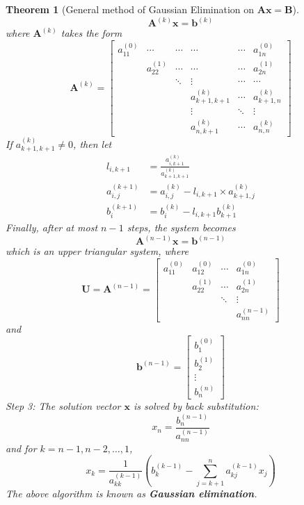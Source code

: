 \documentclass[12pt]{article}
\newtheorem{theorem}{Theorem}[section]
\theoremstyle{definition}
\begin{document}
\begin{theorem}[General method of Gaussian Elimination on $\mathbf{A}\mathbf{x}=\mathbf{B}$]
\[
\mathbf{A}^{(k)}\mathbf{x}=\mathbf{b}^{(k)}
\]
where $\mathbf{A}^{(k)}$ takes the form
\[
\mathbf{A}^{(k)}=\begin{bmatrix}
a_{11}^{(0)}&\cdots       &\cdots&\cdots            &\cdots&a_{1n}^{(0)}\\
            &a_{22}^{(1)} &\cdots&\cdots            &\cdots&a_{2n}^{(1)}\\
            &             &\ddots&\vdots            &\cdots&\cdots      \\
            &             &      &a_{k+1,k+1}^{(k)} &\cdots&a_{k+1,n}^{(k)}\\
            &             &      &\vdots            &\ddots&\vdots\\
            &             &      &a_{n,k+1}^{(k)} &\cdots&a_{n,n}^{(k)}
            \end{bmatrix}
\]
If $a_{k+1,k+1}^{(k)}\neq 0$, then let
\begin{align*}
l_{i,k+1}&=\frac{a^{(k)}_{i,k+1}}{a^{(k)}_{k+1,k+1}}\\
a^{(k+1)}_{i,j}&=a^{(k)}_{i,j}-l_{i,k+1}\times a^{(k)}_{k+1,j}\\
b_i^{(k+1)}&=b_i^{(k)}-l_{i,k+1}b^{(k)}_{k+1}
\end{align*}
Finally, after at most $n-1$ steps, the system becomes
\[
\mathbf{A}^{(n-1)}\mathbf{x}=\mathbf{b}^{(n-1)}
\]
which is an upper triangular system, where
\[
\mathbf{U}=\mathbf{A}^{(n-1)}=\begin{bmatrix}
a_{11}^{(0)}&a_{12}^{(0)}&\cdots&a_{1n}^{(0)}\\
 &a_{22}^{(1)}&\cdots&a_{2n}^{(1)}\\
 & &\ddots&\vdots\\
&&&a_{nn}^{(n-1)}\end{bmatrix}
\]and\[
\mathbf{b}^{(n-1)} = \begin{bmatrix}
b_1^{(0)}\\
b_2^{(1)}\\
\vdots\\
b_n^{(n)}
\end{bmatrix}
\]
Step 3: The solution vector $\mathbf{x}$ is solved by back substitution:
\[
x_n = \frac{b_n^{(n-1)}}{a_{nn}^{(n-1)}}
\]
and for $k = n-1, n-2,\ldots, 1$,
\[
x_k = \frac{1}{a_{kk}^{(k-1)}}\left(b_k^{(k-1)}-\sum_{j=k+1}^n a_{kj}^{(k-1)}x_j\right)
\]
The above algorithm is known as \textbf{Gaussian elimination}.
\end{theorem}
\end{document}

